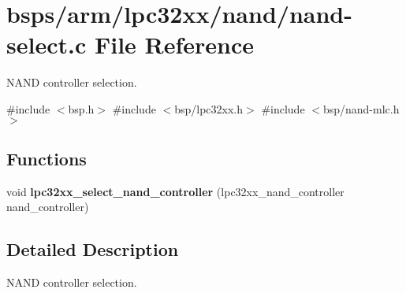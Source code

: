 \hypertarget{nand-select_8c}{}\section{bsps/arm/lpc32xx/nand/nand-\/select.c File Reference}
\label{nand-select_8c}


N\+A\+ND controller selection.  


{\ttfamily \#include $<$bsp.\+h$>$}\newline
{\ttfamily \#include $<$bsp/lpc32xx.\+h$>$}\newline
{\ttfamily \#include $<$bsp/nand-\/mlc.\+h$>$}\newline
\subsection*{Functions}
\begin{DoxyCompactItemize}
\item 
void {\bfseries lpc32xx\+\_\+select\+\_\+nand\+\_\+controller} (lpc32xx\+\_\+nand\+\_\+controller nand\+\_\+controller)
\end{DoxyCompactItemize}


\subsection{Detailed Description}
N\+A\+ND controller selection. 

